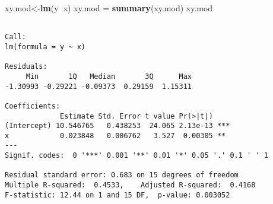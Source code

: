 \documentclass[]{article}
\newenvironment{Shaded}{\begin{snugshade}}{\end{snugshade}}
\newcommand{\KeywordTok}[1]{\textcolor[rgb]{0.13,0.29,0.53}{\textbf{#1}}}
\newcommand{\StringTok}[1]{\textcolor[rgb]{0.31,0.60,0.02}{#1}}
\newcommand{\OperatorTok}[1]{\textcolor[rgb]{0.81,0.36,0.00}{\textbf{#1}}}
\newcommand{\NormalTok}[1]{#1}
\begin{document}
{\begin{Shaded}
\begin{Highlighting}[]
\NormalTok{xy.mod<-}\KeywordTok{lm}\NormalTok{(y}\OperatorTok{~}\NormalTok{x)}
\NormalTok{xy.mod =}\StringTok{ }\KeywordTok{summary}\NormalTok{(xy.mod)}
\NormalTok{xy.mod}
\end{Highlighting}
\end{Shaded}

\begin{verbatim}

Call:
lm(formula = y ~ x)

Residuals:
     Min       1Q   Median       3Q      Max 
-1.30993 -0.29221 -0.09373  0.29159  1.15311 

Coefficients:
             Estimate Std. Error t value Pr(>|t|)    
(Intercept) 10.546765   0.438253  24.065 2.13e-13 ***
x            0.023848   0.006762   3.527  0.00305 ** 
---
Signif. codes:  0 '***' 0.001 '**' 0.01 '*' 0.05 '.' 0.1 ' ' 1

Residual standard error: 0.683 on 15 degrees of freedom
Multiple R-squared:  0.4533,    Adjusted R-squared:  0.4168 
F-statistic: 12.44 on 1 and 15 DF,  p-value: 0.003052
\end{verbatim}
\end{document}
